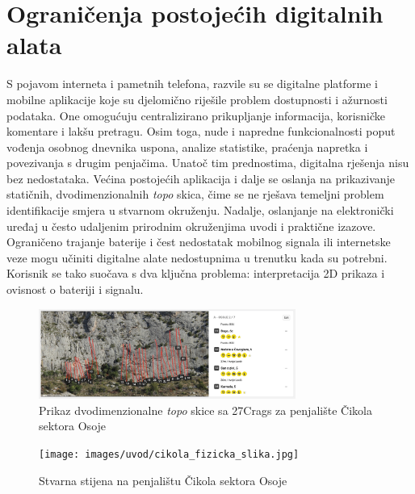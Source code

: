 \section{Ograničenja postojećih digitalnih alata}

S pojavom interneta i pametnih telefona, razvile su se digitalne platforme i mobilne aplikacije koje su djelomično riješile problem dostupnosti i ažurnosti podataka. One omogućuju centralizirano prikupljanje informacija, korisničke komentare i lakšu pretragu. Osim toga, nude i napredne funkcionalnosti poput vođenja osobnog dnevnika uspona, analize statistike, praćenja napretka i povezivanja s drugim penjačima.
Unatoč tim prednostima, digitalna rješenja nisu bez nedostataka. Većina postojećih aplikacija i dalje se oslanja na prikazivanje statičnih, dvodimenzionalnih \textit{topo} skica, čime se ne rješava temeljni problem identifikacije smjera u stvarnom okruženju. Nadalje, oslanjanje na elektronički uređaj u često udaljenim prirodnim okruženjima uvodi i praktične izazove. Ograničeno trajanje baterije i čest nedostatak mobilnog signala ili internetske veze mogu učiniti digitalne alate nedostupnima u trenutku kada su potrebni. Korisnik se tako suočava s dva ključna problema: interpretacija 2D prikaza i ovisnost o bateriji i signalu.

\begin{figure}[H]
    \centering
    \includegraphics[width=0.75\textwidth]{images/uvod/cikola_27crags_topo.jpeg}
    \caption{Prikaz dvodimenzionalne \textit{topo} skice sa 27Crags za penjalište Čikola sektora Osoje}
\end{figure}

\begin{figure}[H]
    \centering
    \texttt{[image: images/uvod/cikola\_fizicka\_slika.jpg]}
    \caption{Stvarna stijena na penjalištu Čikola sektora Osoje}
\end{figure} 